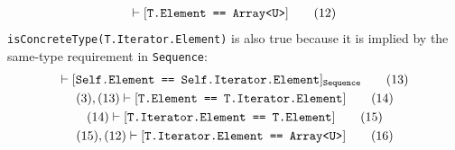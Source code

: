 \documentclass[../generics]{subfiles}
\begin{document}
\begin{example}
\begin{gather}
\vdash[\texttt{T.Element == Array<U>}]\tag{12}
\end{gather}
\texttt{isConcreteType(T.Iterator.Element)} is also true because it is implied by the same-type requirement in \texttt{Sequence}:
\begin{gather}
\vdash[\texttt{Self.Element == Self.Iterator.Element}]_\texttt{Sequence}\tag{13}\\
(3),(13)\vdash[\texttt{T.Element == T.Iterator.Element}]\tag{14}\\
(14)\vdash[\texttt{T.Iterator.Element == T.Element}]\tag{15}\\
(15),(12)\vdash[\texttt{T.Iterator.Element == Array<U>}]\tag{16}
\end{gather}
\end{example}

\end{document}
